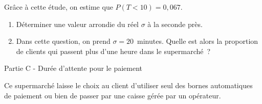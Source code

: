 \par
Grâce à cette étude, on estime que $P(T < 10) = 0,067$.
\medskip
\begin{enumerate}
     \item Déterminer une valeur arrondie du réel $\sigma$ à la seconde près.
     \item Dans cette question, on prend $\sigma = 20$~minutes. Quelle est alors la proportion de clients qui
     passent plus d'une heure dans le supermarché~?
\end{enumerate}
\bigskip
\begin{center}\begin{h3}Partie C - Durée d'attente pour le paiement \end{h3}\end{center}
\medskip
Ce supermarché laisse le choix au client d'utiliser seul des bornes automatiques de paiement ou
bien de passer par une caisse gérée par un opérateur.
\medskip
